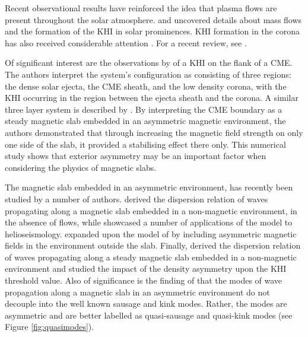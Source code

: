 Recent observational results have reinforced the idea that plasma flows are present throughout the solar atmosphere.
\cite{Berger2010} and \cite{Ryutova2010} uncovered details about mass flows and the formation of the KHI in solar prominences.
KHI formation in the corona has also received considerable attention \citep[see][]{Foullon2011, Ofman2011, Foullon2013}.
For a recent review, see \cite{Zhelyazkov2015}.

Of significant interest are the observations by \cite{Foullon2011} of a KHI on the flank of a CME.
The authors interpret the system's configuration as consisting of three regions: the dense solar ejecta, the CME sheath, and the low density corona, with the KHI occurring in the region between the ejecta sheath and the corona.
A similar three layer system is described by \cite{Mostl2013}.
By interpreting the CME boundary as a steady magnetic slab embedded in an asymmetric magnetic environment, the authors demonstrated that through increasing the magnetic field strength on only one side of the slab, it provided a stabilising effect there only.
This numerical study shows that exterior asymmetry may be an important factor when considering the physics of magnetic slabs.

The magnetic slab embedded in an asymmetric environment, has recently been studied by a number of authors.
\cite{Allcock2017} derived the dispersion relation of waves propagating along a magnetic slab embedded in a non-magnetic environment, in the absence of flows, while \cite{Allcock2018} showcased a number of applications of the model to helioseismology.
\cite{Zsamberger2018} expanded upon the model of \cite{Allcock2017} by including asymmetric magnetic fields in the environment outside the slab.
Finally, \cite{Barbulescu2018} derived the dispersion relation of waves propagating along a steady magnetic slab embedded in a non-magnetic environment and studied the impact of the density asymmetry upon the KHI threshold value.
Also of significance is the finding of \cite{Allcock2017} that the modes of wave propagation along a magnetic slab in an asymmetric environment do not decouple into the well known sausage and kink modes.
Rather, the modes are asymmetric and are better labelled as quasi-sausage and quasi-kink modes (see Figure \ref{fig:quasimodes}).

